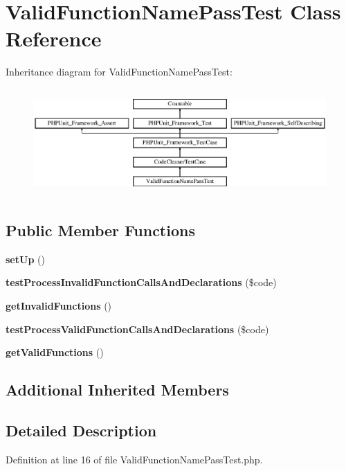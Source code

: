 \section{Valid\+Function\+Name\+Pass\+Test Class Reference}
\label{class_psy_1_1_test_1_1_code_cleaner_1_1_valid_function_name_pass_test}
Inheritance diagram for Valid\+Function\+Name\+Pass\+Test\+:\begin{figure}[H]
\begin{center}
\leavevmode
\includegraphics[height=4.129793cm]{class_psy_1_1_test_1_1_code_cleaner_1_1_valid_function_name_pass_test}
\end{center}
\end{figure}
\subsection*{Public Member Functions}
\begin{DoxyCompactItemize}
\item 
{\bf set\+Up} ()
\item 
{\bf test\+Process\+Invalid\+Function\+Calls\+And\+Declarations} (\$code)
\item 
{\bf get\+Invalid\+Functions} ()
\item 
{\bf test\+Process\+Valid\+Function\+Calls\+And\+Declarations} (\$code)
\item 
{\bf get\+Valid\+Functions} ()
\end{DoxyCompactItemize}
\subsection*{Additional Inherited Members}


\subsection{Detailed Description}


Definition at line 16 of file Valid\+Function\+Name\+Pass\+Test.\+php.



